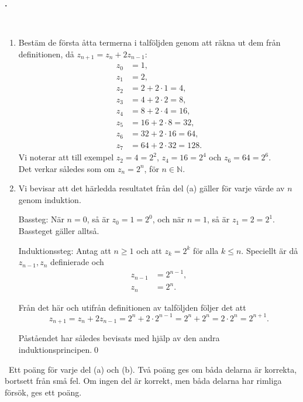 \documentclass[11pt,a4paper,oneside,notitlepage,final]{article}
\newcounter{harjnro}
\newenvironment{harjlist}
  {\begin{list}{\kor{\arabic{harjnro}.}}
    {\usecounter{harjnro}
      \setlength{\labelwidth}{0em}
      \setlength{\labelsep}{0.4em}
      \setlength{\leftmargin}{0pt}
      \setlength{\parsep}{5pt}
      \setlength{\itemindent}{0.4em}
      \setlength{\topsep}{0.5\parskip}
      \setlength{\itemsep}{0.75\parskip}
    }
  }
  {\end{list}}
\newcommand{\kor}[1]{\textbf{#1}}
\begin{document}
\begin{harjlist}
\vspace{0.4cm}
\losning \
\begin{enumerate}
\item[(a)] Bestäm de första åtta termerna i talföljden genom att räkna ut dem från definitionen, då $z_{n+1}=z_n+2z_{n-1}$:
\begin{align*}
z_0&=1,\\
z_1&=2,\\
z_2&=2+2\cdot 1=4,\\
z_3&=4+2\cdot 2=8,\\
z_4&=8+2\cdot 4=16,\\
z_5&=16+2\cdot 8=32,\\
z_6&=32+2\cdot 16=64,\\
z_7&=64+2\cdot 32=128.
\end{align*}
Vi noterar att till exempel 
$z_2=4=2^2$, $z_4=16=2^4$ och $z_6=64=2^6$.\\

Det verkar således som om $z_n=2^n$, för $n\in \mathbb{N}$.

\item[(b)] Vi bevisar att det härledda resultatet från del (a) gäller för varje värde av $n$ genom induktion.

Bassteg: När $n=0$, så är $z_0=1=2^0$, och när $n=1$, så är $z_1=2=2^1$. Bassteget gäller alltså. 

Induktionssteg: Antag att $n\geq 1$ och att $z_k=2^k$ för alla $k\le n$. Speciellt är då $z_{n-1}, z_{n}$ definierade och 
\begin{align*}
z_{n-1}&=2^{n-1},\\
z_{n}&=2^{n}.
\end{align*}

Från det här och utifrån definitionen av talföljden följer det att
$$z_{n+1}=z_{n}+2 z_{n-1}=2^n+2\cdot 2^{n-1}=2^{n}+2^{n}=2\cdot 2^{n}=2^{n+1}.$$

Påståendet har således bevisats med hjälp av den andra induktionsprincipen.\qed

\end{enumerate}

\bedomning \
Ett poäng för varje del (a) och (b). Två poäng ges om båda delarna är korrekta, bortsett från små fel. Om ingen del är korrekt, men båda delarna har rimliga försök, ges ett poäng.

\end{harjlist}
\end{document}
